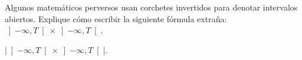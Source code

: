 

\bigskip

\enunciadoS Algunos matem\'aticos perversos usan corchetes invertidos
para denotar intervalos abiertos. Explique c\'omo escribir la
siguiente f\'ormula extra\~na: 
$\left]-\infty,T\right[ \times \left]-\infty, T\right[$.

\bigskip

\respuestaS |$\left]-\infty,T\right[ \times \left]-\infty, T\right[$|.

\bye

